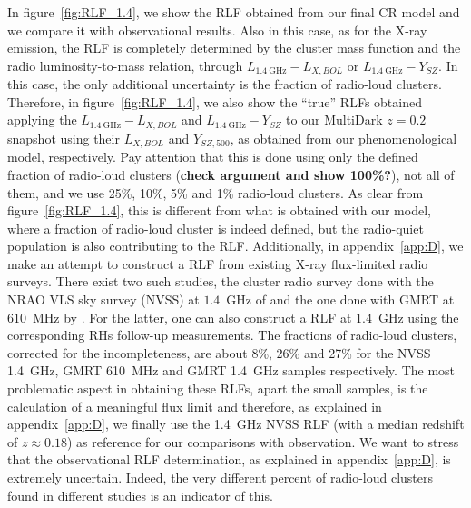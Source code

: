 \documentclass[traditabstract]{aa}
\newcommand{\rmn}{\mathrm}
\begin{document}
In figure~\ref{fig:RLF_1.4}, we show the RLF obtained from our final CR model and we compare it with observational results. Also in this case, as for the X-ray emission, the RLF is completely determined by the cluster mass function and the radio luminosity-to-mass relation, through $L_{1.4~\rmn{GHz}}-L_{X, BOL}$ or $L_{1.4~\rmn{GHz}}-Y_{SZ}$. In this case, the only additional uncertainty is the fraction of radio-loud clusters. Therefore, in figure~\ref{fig:RLF_1.4}, we also show the ``true'' RLFs obtained applying  the $L_{1.4~\rmn{GHz}}-L_{X, BOL}$ and $L_{1.4~\rmn{GHz}}-Y_{SZ}$ to our MultiDark $z = 0.2$ snapshot using their $L_{X, BOL}$ and $Y_{SZ, 500}$, as obtained from our phenomenological model, respectively. Pay attention that this is done using only the defined fraction of radio-loud clusters ({\bf check argument and show 100\%?}), not all of them, and we use  25\%, 10\%, 5\% and 1\% radio-loud clusters. As clear from figure~\ref{fig:RLF_1.4}, this is different from what is obtained with our model, where a fraction of radio-loud cluster is indeed defined, but the radio-quiet population is also contributing to the RLF. Additionally, in appendix~\ref{app:D}, we make an attempt to construct a RLF from existing X-ray flux-limited radio surveys. There exist two such studies, the cluster radio survey done with the NRAO VLS sky survey (NVSS) at $1.4$~GHz of \cite{1999NewA....4..141G} and the one done with GMRT at $610$~MHz by \cite{VenturiGMRT_1,VenturiGMRT_2}. For the latter, one can also construct a RLF at 1.4~GHz using the corresponding RHs follow-up measurements. The fractions of radio-loud clusters, corrected for the incompleteness, are about 8\%, 26\% and 27\% for the NVSS 1.4~GHz, GMRT 610~MHz and GMRT 1.4~GHz samples respectively. The most problematic aspect in obtaining these RLFs, apart the small samples, is the calculation of a meaningful flux limit and therefore, as explained in appendix~\ref{app:D}, we finally use the 1.4~GHz NVSS RLF (with a median redshift of $z \approx 0.18$) as reference for our comparisons with observation. We want to stress that the observational RLF determination, as explained in appendix~\ref{app:D}, is extremely uncertain. Indeed, the very different percent of radio-loud clusters found in different studies is an indicator of this. 
\end{document}
